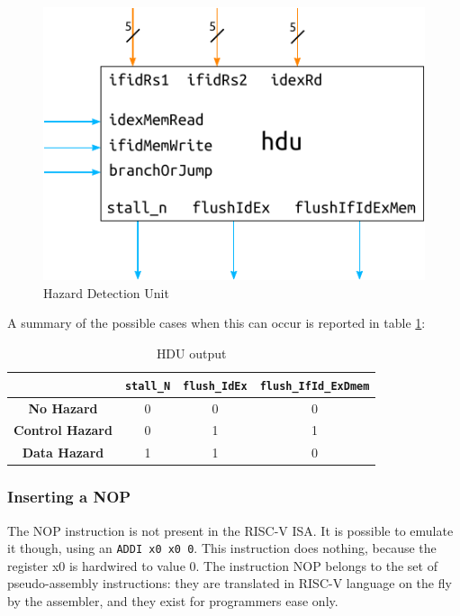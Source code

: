 \documentclass[a4paper]{article}
\begin{document}
\begin{figure}[hbtp]
    \centering
    \includegraphics[]{../hdu/ref/schematic/hdu.pdf}
    \caption{Hazard Detection Unit}
    \label{fig:hdu}
\end{figure}
A summary of the possible cases when this can occur is reported in table \ref{tab:hdu_output}:

\begin{table}[hbtp]
\centering
\begin{tabular}{|c|c|c|c|}
\hline
                        & \texttt{stall\_N} & \texttt{flush\_IdEx} & \texttt{flush\_IfId\_ExDmem} \\ \hline
\textbf{No Hazard}      & 0                          & 0                             & 0                                     \\ \hline
\textbf{Control Hazard} & 0                          & 1                             & 1                                     \\ \hline
\textbf{Data Hazard}    & 1                          & 1                             & 0                                     \\ \hline
\end{tabular}
\caption{HDU output}
\label{tab:hdu_output}
\end{table}

\subsubsection{Inserting a NOP} 
The NOP instruction is not present in the RISC-V ISA. It is possible to emulate it though, using an \texttt{ADDI x0 x0 0}. This instruction does nothing, because the register x0 is hardwired to value 0. The instruction NOP belongs to the set of pseudo-assembly instructions: they are translated in RISC-V language on the fly by the assembler, and they exist for programmers ease only.
\end{document}
